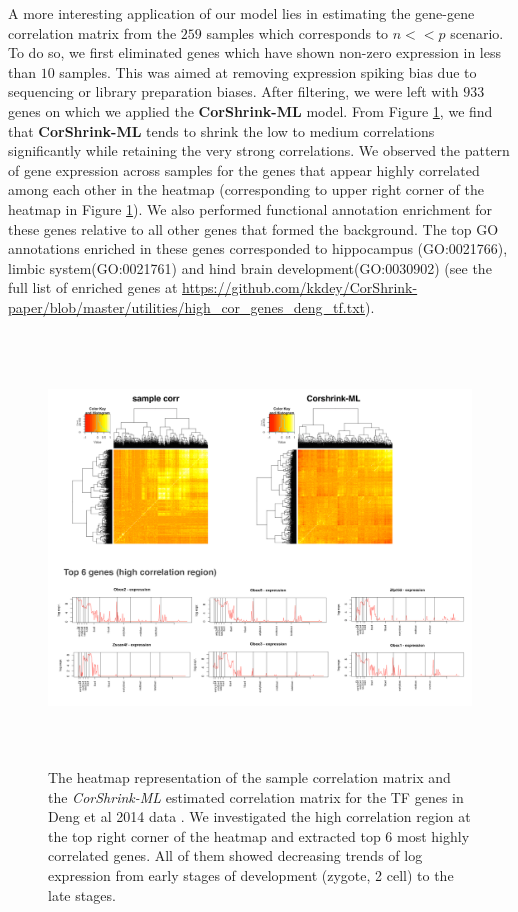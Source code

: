 A more interesting application of our model lies in estimating the gene-gene correlation matrix from the $259$ samples which corresponds to $n << p$ scenario. To do so, we first eliminated genes which have shown non-zero expression in less than $10$ samples. This was aimed at removing expression spiking bias due to sequencing or library preparation biases. After filtering, we were left with $933$ genes on which we applied the \textbf{CorShrink-ML} model. From Figure \ref{fig:fig4}, we find that \textbf{CorShrink-ML} tends to shrink the low to medium correlations significantly while retaining the very strong correlations. We observed the pattern of gene expression across samples for the genes that appear highly correlated among each other in the heatmap (corresponding to upper right corner of the heatmap in Figure \ref{fig:fig4}). We also performed functional annotation enrichment for these genes relative to all other genes that formed the background. The top GO annotations enriched in these genes corresponded to hippocampus (GO:0021766),  limbic system(GO:0021761) and hind brain development(GO:0030902) (see the full list of enriched genes at \url{https://github.com/kkdey/CorShrink-paper/blob/master/utilities/high_cor_genes_deng_tf.txt}). 

\begin{figure}[h]
\raggedleft
\includegraphics[height=4.5in, width=6in]{../figures/paper_figures/figure4.pdf}
 \caption{\small{The heatmap representation of the sample correlation matrix and the \textit{CorShrink-ML} estimated correlation matrix for the TF genes in Deng et al 2014 data \cite{Deng2014}. We investigated the high correlation region at the top right corner of the heatmap and extracted top $6$  most highly correlated genes. All of them showed decreasing trends of log expression from early stages of development (zygote, 2 cell) to the late stages.}}
\label{fig:fig4}
\end{figure}

